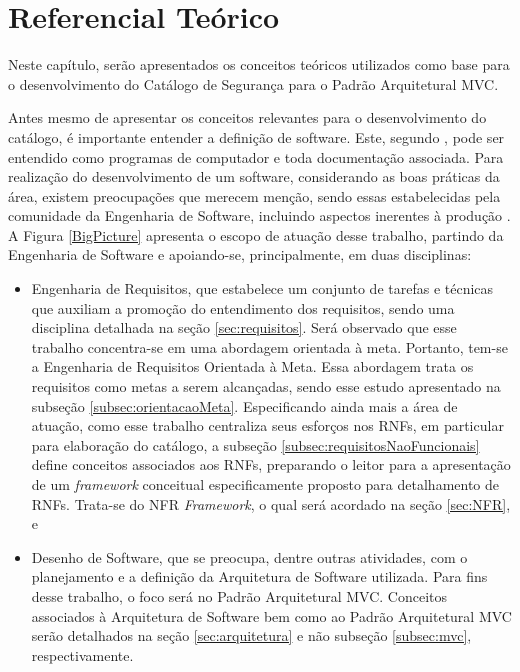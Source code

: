 \chapter[Referencial Teórico]{Referencial Teórico}
\label{chap:referencialTeorico}

Neste capítulo, serão apresentados os conceitos teóricos utilizados como base para o desenvolvimento do Catálogo de Segurança para o Padrão Arquitetural MVC.

Antes mesmo de apresentar os conceitos relevantes para o desenvolvimento do catálogo, é importante entender a definição de software. Este, segundo \cite{sommerville2003engenharia}, pode ser entendido como programas de computador e toda documentação associada. Para realização do desenvolvimento de um software, considerando as boas práticas da área, existem preocupações que merecem menção, sendo essas estabelecidas pela comunidade da Engenharia de Software, incluindo aspectos inerentes à produção \cite{sommerville2003engenharia}. A Figura \ref{BigPicture} apresenta o escopo de atuação desse trabalho, partindo da Engenharia de Software e apoiando-se, principalmente, em duas disciplinas: 

\begin{itemize}
	
	\item Engenharia de Requisitos, que estabelece um conjunto de tarefas e técnicas que auxiliam a promoção do entendimento dos requisitos, sendo uma disciplina detalhada na seção \ref{sec:requisitos}. Será observado que esse trabalho concentra-se em uma abordagem orientada à meta. Portanto, tem-se a Engenharia de Requisitos Orientada à Meta. Essa abordagem trata os requisitos como metas a serem alcançadas, sendo esse estudo apresentado na subseção \ref{subsec:orientacaoMeta}. Especificando ainda mais a área de atuação, como esse trabalho centraliza seus esforços nos RNFs, em particular para elaboração do catálogo, a subseção \ref{subsec:requisitosNaoFuncionais} define conceitos associados aos RNFs, preparando o leitor para a apresentação de um \textit{framework} conceitual especificamente proposto para detalhamento de RNFs. Trata-se do NFR \textit{Framework}, o qual será acordado na seção \ref{sec:NFR}, e
	
	\item Desenho de Software, que se preocupa, dentre outras atividades, com o planejamento e a definição da Arquitetura de Software utilizada. Para fins desse trabalho, o foco será no Padrão Arquitetural MVC. Conceitos associados à Arquitetura de Software bem como ao Padrão Arquitetural MVC serão detalhados na seção \ref{sec:arquitetura} e não subseção \ref{subsec:mvc}, respectivamente.
	
\end{itemize}

